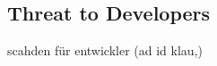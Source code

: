 \subsection{Threat to Developers} \label{subsection:foundation-piracy-developers}
scahden für entwickler (ad id klau,)\newline
